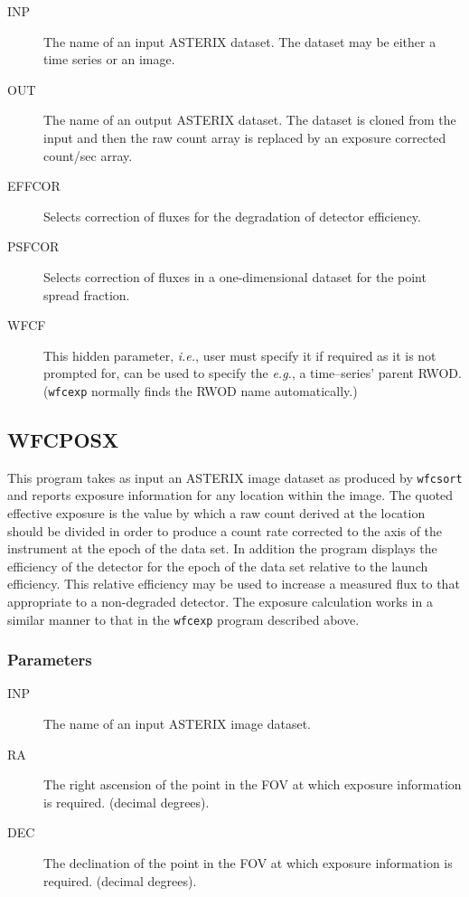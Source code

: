 \begin{description}

\item[INP]
The name of an input ASTERIX dataset. The dataset may be either a time series
or an image.

\item[OUT]
The name of an output ASTERIX dataset. The dataset is cloned from the input and
then the raw count array is replaced by an exposure corrected
count/sec array.

\item[EFFCOR]
Selects correction of fluxes for the degradation of detector efficiency.

\item[PSFCOR]
Selects correction of fluxes in a one-dimensional dataset for the point
spread fraction.

\item[WFCF]
This hidden parameter, {\em i.e.}, user must specify it if
required as it is not prompted for, can be used to specify the {\em e.g.},
a time--series' parent RWOD.  ({\tt wfcexp} normally finds the RWOD name
automatically.)

\end{description}

\subsection{WFCPOSX}
\label{sec:programs:wfcposx}

This program takes as input an ASTERIX image dataset as produced by
{\tt wfcsort} and reports exposure information for any location within
the image.  The quoted effective exposure is the value by which a raw
count derived at the location should be divided in order to produce a
count rate corrected to the axis of the instrument at the epoch of the
data set.  In addition the program displays the efficiency of the
detector for the epoch of the data set relative to the launch
efficiency. This relative efficiency may be used to increase a measured
flux to that appropriate to a non-degraded detector. The exposure
calculation works in a similar manner to that in the {\tt wfcexp}
program described above.

\subsubsection{Parameters}

\begin{description}

\item[INP]
The name of an input ASTERIX image dataset.

\item[RA]
The right ascension of the point in the FOV at which exposure information
is required. (decimal degrees).

\item[DEC]
The declination of the point in the FOV at which exposure information
is required. (decimal degrees).

\end{description}


